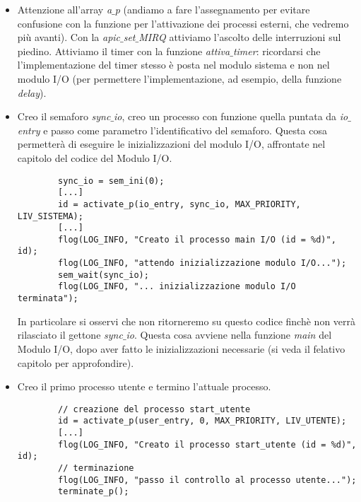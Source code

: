 \begin{itemize}
	\item Attenzione all'array \emph{a$\_$p} (andiamo a fare l'assegnamento per evitare confusione con la funzione per l'attivazione dei processi esterni, che vedremo più avanti). Con la \emph{apic$\_$set$\_$MIRQ} attiviamo l'ascolto delle interruzioni sul piedino. Attiviamo il timer con la funzione \emph{attiva$\_$timer}: ricordarsi che l'implementazione del timer stesso è posta nel modulo sistema e non nel modulo I/O (per permettere l'implementazione, ad esempio, della funzione \emph{delay}).
	\item Creo il semaforo \emph{sync$\_$io}, creo un processo con funzione quella puntata da \emph{io$\_$entry} e passo come parametro l'identificativo del semaforo. Questa cosa permetterà di eseguire le inizializzazioni del modulo I/O, affrontate nel capitolo del codice del Modulo I/O.
	\small
	\begin{verbatim}
		sync_io = sem_ini(0);
		[...]
		id = activate_p(io_entry, sync_io, MAX_PRIORITY, LIV_SISTEMA);
		[...]
		flog(LOG_INFO, "Creato il processo main I/O (id = %d)", id);
		flog(LOG_INFO, "attendo inizializzazione modulo I/O...");
		sem_wait(sync_io);
		flog(LOG_INFO, "... inizializzazione modulo I/O terminata");
	\end{verbatim}
	\normalsize
	In particolare si osservi che non ritorneremo su questo codice finchè non verrà rilasciato il gettone \emph{sync$\_$io}. Questa cosa avviene nella funzione \emph{main} del Modulo I/O, dopo aver fatto le inizializzazioni necessarie (si  veda il felativo capitolo per approfondire).
	\item Creo il primo processo utente e termino l'attuale processo.
	\small 
	\begin{verbatim}
		// creazione del processo start_utente
		id = activate_p(user_entry, 0, MAX_PRIORITY, LIV_UTENTE);
		[...]
		flog(LOG_INFO, "Creato il processo start_utente (id = %d)", id);
		// terminazione
		flog(LOG_INFO, "passo il controllo al processo utente...");
		terminate_p();
	\end{verbatim}
	\normalsize
\end{itemize}